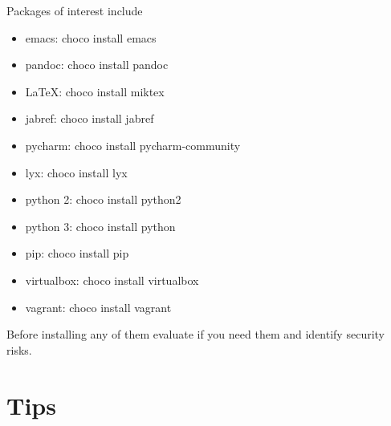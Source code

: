 
Packages of interest include

\begin{itemize}

\item emacs: choco install emacs

\item pandoc: choco install pandoc

\item LaTeX: choco install miktex

\item jabref: choco install jabref

\item pycharm: choco install pycharm-community

\item lyx: choco install lyx

\item python 2: choco install python2

\item python 3: choco install python

\item pip: choco install pip

\item virtualbox: choco install virtualbox

\item vagrant: choco install vagrant

\end{itemize}

Before installing any of them evaluate if you need them and identify
security risks.


\section{Tips}

